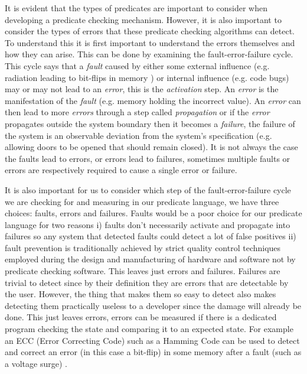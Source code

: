 It is evident that the types of predicates are important to consider when developing a predicate checking mechanism. However, it is also important to consider the types of errors that these predicate checking algorithms can detect. To understand this it is first important to understand the errors themselves and how they can arise. This can be done by examining the fault-error-failure cycle. This cycle says that a \emph{fault} caused by either some external influence (e.g. radiation leading to bit-flips in memory \cite{1017791}) or internal influence (e.g. code bugs) may or may not lead to an \emph{error}, this is the \emph{activation} step. An \emph{error} is the manifestation of the \emph{fault} (e.g. memory holding the incorrect value). An \emph{error} can then lead to more \emph{errors} through a step called \emph{propagation} or if the \emph{error} propagates outside the system boundary then it becomes a \emph{failure}, the failure of the system is an observable deviation from the system's specification (e.g. allowing doors to be opened that should remain closed). It is not always the case the faults lead to errors, or errors lead to failures, sometimes multiple faults or errors are respectively required to cause a single error or failure. \cite{1335465}

It is also important for us to consider which step of the fault-error-failure cycle we are checking for and measuring in our predicate language, we have three choices: faults, errors and failures. Faults would be a poor choice for our predicate language for two reasons i) faults don't necessarily activate and propagate into failures so any system that detected faults could detect a lot of false positives ii) fault prevention is traditionally achieved by strict quality control techniques employed during the design and manufacturing of hardware and software\cite{dependability} not by predicate checking software. This leaves just errors and failures. Failures are trivial to detect since by their definition they are errors that are detectable by the user. However, the thing that makes them so easy to detect also makes detecting them practically useless to a developer since the damage will already be done. This just leaves errors, errors can be measured if there is a dedicated program checking the state and comparing it to an expected state. For example an ECC (Error Correcting Code) such as a Hamming Code can be used to detect and correct an error (in this case a bit-flip) in some memory after a fault (such as a voltage surge) \cite{hamming1950error}.

